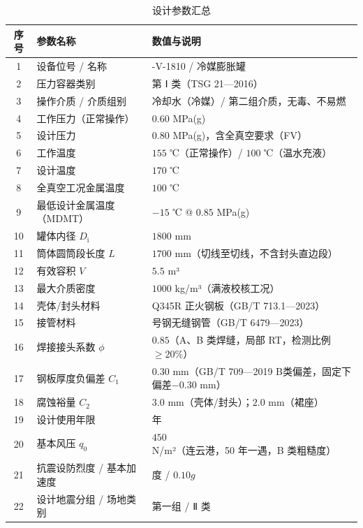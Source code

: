 \begin{table}[!htb]
  \centering
  \caption{设计参数汇总}
  \label{tab:design-summary}
  \small\renewcommand{\arraystretch}{1.1}
  \setlength{\tabcolsep}{6pt}
  \begin{tabularx}{\textwidth}{@{}c >{\centering\arraybackslash}X >{\centering\arraybackslash}X@{}}
    \toprule
    \textbf{序号} & \textbf{参数名称} & \textbf{数值与说明} \\
    \midrule
    1  & 设备位号 / 名称             & 22-V-1810 / 冷媒膨胀罐 \\
    2  & 压力容器类别                & 第 Ⅰ 类（TSG 21—2016） \\
    3  & 操作介质 / 介质组别          & 冷却水（冷媒）/ 第二组介质，无毒、不易燃 \\
    4  & 工作压力（正常操作）         & $0.60$ MPa(g) \\
    5  & 设计压力                    & $0.80$ MPa(g)，含全真空要求（FV） \\
    6  & 工作温度                    & $155$ ℃（正常操作）/ $100$ ℃（温水充液） \\
    7  & 设计温度                    & $170$ ℃ \\
    8  & 全真空工况金属温度           & $100$ ℃ \\
    9  & 最低设计金属温度（MDMT）     & $-15$ ℃ @ $0.85$ MPa(g) \\
    10 & 罐体内径 $D_{\mathrm{i}}$              & $1800$ mm \\
    11 & 筒体圆筒段长度 $L$           & $1700$ mm（切线至切线，不含封头直边段） \\
    12 & 有效容积 $V$                 & $5.5$ m³ \\
    13 & 最大介质密度                & $1000$ kg/m³（满液校核工况） \\
    14 & 壳体/封头材料               & Q345R 正火钢板（GB/T 713.1—2023） \\
    15 & 接管材料                    & 20 号钢无缝钢管（GB/T 6479—2023） \\
    16 & 焊接接头系数 $\phi$          & $0.85$（A、B 类焊缝，局部 RT，检测比例 $\ge 20\%$） \\
    17 & 钢板厚度负偏差 $C_1$         & $0.30$ mm（GB/T 709—2019 B类偏差，固定下偏差$-0.30$ mm） \\
    18 & 腐蚀裕量 $C_2$               & $3.0$ mm（壳体/封头）；$2.0$ mm（裙座） \\
    19 & 设计使用年限                & 15 年 \\
    20 & 基本风压 $q_0$               & $450$ N/m²（连云港，50 年一遇，B 类粗糙度） \\
    21 & 抗震设防烈度 / 基本加速度    & 7 度 / $0.10g$ \\
    22 & 设计地震分组 / 场地类别      & 第一组 / Ⅱ 类 \\
    \bottomrule
  \end{tabularx}
\end{table}

